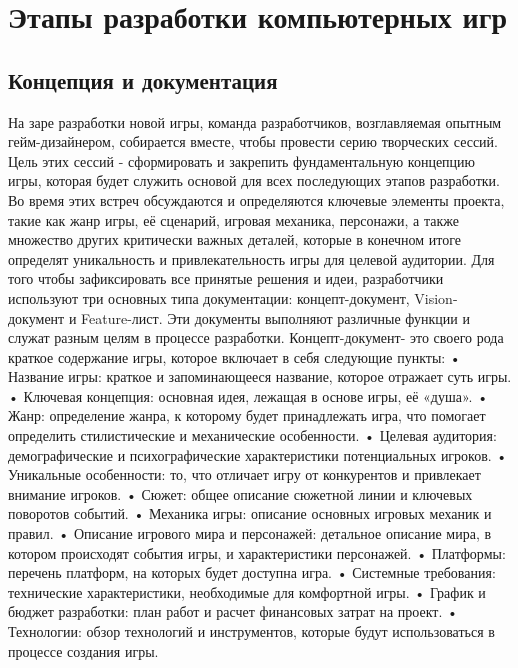 \section{Этапы разработки компьютерных игр}
\subsection{Концепция и документация}

На заре разработки новой игры, команда разработчиков, возглавляемая опытным гейм-дизайнером, собирается вместе, чтобы провести серию творческих сессий. Цель этих сессий - сформировать и закрепить фундаментальную концепцию игры, которая будет служить основой для всех последующих этапов разработки. Во время этих встреч обсуждаются и определяются ключевые элементы проекта, такие как жанр игры, её сценарий, игровая механика, персонажи, а также множество других критически важных деталей, которые в конечном итоге определят уникальность и привлекательность игры для целевой аудитории.
Для того чтобы зафиксировать все принятые решения и идеи, разработчики используют три основных типа документации: концепт-документ, Vision-документ и Feature-лист. Эти документы выполняют различные функции и служат разным целям в процессе разработки.
Концепт-документ- это своего рода краткое содержание игры, которое включает в себя следующие пункты:
    • Название игры: краткое и запоминающееся название, которое отражает суть игры.\newline
    • Ключевая концепция: основная идея, лежащая в основе игры, её «душа».\newline
    • Жанр: определение жанра, к которому будет принадлежать игра, что помогает определить стилистические и механические особенности.\newline
    • Целевая аудитория: демографические и психографические характеристики потенциальных игроков.\newline
    • Уникальные особенности: то, что отличает игру от конкурентов и привлекает внимание игроков.\newline
    • Сюжет: общее описание сюжетной линии и ключевых поворотов событий.\newline
    • Механика игры: описание основных игровых механик и правил.\newline
    • Описание игрового мира и персонажей: детальное описание мира, в котором происходят события игры, и характеристики персонажей.\newline
    • Платформы: перечень платформ, на которых будет доступна игра.\newline
    • Системные требования: технические характеристики, необходимые для комфортной игры.\newline
    • График и бюджет разработки: план работ и расчет финансовых затрат на проект.\newline
    • Технологии: обзор технологий и инструментов, которые будут использоваться в процессе создания игры.\newline

